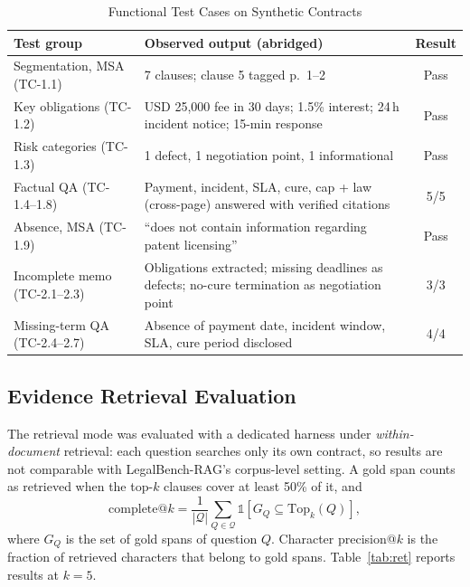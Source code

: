 \documentclass[conference]{IEEEtran}
\begin{document}
\begin{table}[t]
\caption{Functional Test Cases on Synthetic Contracts}
\label{tab:func}
\centering
\footnotesize
\setlength{\tabcolsep}{3pt}
\begin{tabular}{@{}>{\raggedright}p{2.7cm}>{\raggedright}p{4.2cm}c@{}}
\toprule
\textbf{Test group} & \textbf{Observed output (abridged)} & \textbf{Result} \\
\midrule
Segmentation, MSA (TC-1.1) & 7 clauses; clause 5 tagged p.~1--2 & Pass \\
Key obligations (TC-1.2) & USD 25{,}000 fee in 30 days; 1.5\% interest; 24\,h incident notice; 15-min response & Pass \\
Risk categories (TC-1.3) & 1 defect, 1 negotiation point, 1 informational & Pass \\
Factual QA (TC-1.4--1.8) & Payment, incident, SLA, cure, cap + law (cross-page) answered with verified citations & 5/5 \\
Absence, MSA (TC-1.9) & ``does not contain information regarding patent licensing'' & Pass \\
Incomplete memo (TC-2.1--2.3) & Obligations extracted; missing deadlines as defects; no-cure termination as negotiation point & 3/3 \\
Missing-term QA (TC-2.4--2.7) & Absence of payment date, incident window, SLA, cure period disclosed & 4/4 \\
\bottomrule
\end{tabular}
\end{table}

\subsection{Evidence Retrieval Evaluation}
The retrieval mode was evaluated with a dedicated harness under \emph{within-document} retrieval: each question searches only its own contract, so results are not comparable with LegalBench-RAG's corpus-level setting. A gold span counts as retrieved when the top-$k$ clauses cover at least 50\% of it, and
\begin{equation}
\mathrm{complete@}k=\frac{1}{|\mathcal{Q}|}\sum_{Q\in\mathcal{Q}}\mathbb{1}\!\left[G_Q\subseteq\mathrm{Top}_k(Q)\right],
\end{equation}
where $G_Q$ is the set of gold spans of question $Q$. Character precision@$k$ is the fraction of retrieved characters that belong to gold spans. Table~\ref{tab:ret} reports results at $k=5$.
\end{document}

